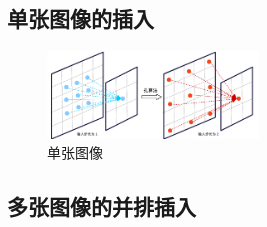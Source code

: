 \subsection{单张图像的插入}

\begin{figure}[h]
	\centering
	\includegraphics[width=0.5\textwidth]{image/chap04/illustration/hole.pdf}
	\caption{单张图像}
 	\label{fig:hole}
\end{figure}


\subsection{多张图像的并排插入}


